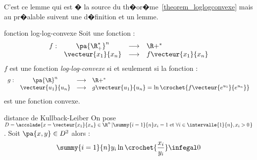 C'est ce lemme qui est � la source du th�or�me~\ref{theorem_loglogconvexe} mais au pr�alable suivent une d�finition et un lemme.








            \begin{xdefinition}{fonction log-log-convexe}
            \label{definition_log_log_convexe}
            Soit une fonction :
                    $$
                    \begin{array}{rccl}
                    f : & \pa{\R^*_+}^n &\longrightarrow& \R+^* \\
                    & \vecteur{x_1}{x_n} &\longrightarrow& f \vecteur{x_1}{x_n}
                    \end{array}
                    $$
            $f$ est une fonction \emph{log-log-convexe} si et seulement si la fonction :
                    $$
                    \begin{array}{rccl}
                    g : & \pa{\R}^n &\longrightarrow& \R+^* \\
                    & \vecteur{u_1}{u_n} &\longrightarrow& g\vecteur{u_1}{u_n} = \ln \crochet{ f \vecteur{e^{u_1}}{e^{u_n}}}
                    \end{array}
                    $$
            est une fonction convexe.
            \end{xdefinition}







            \begin{xlemma}{distance de Kullback-Leiber}
            \label{lemme_loglogconvexe}%
            On pose $D = \accolade{x=\vecteur{x_1}{x_n} \in \R^n \left| \summy{i=1}{n} x_i = 1 \text{ et } 
                            \forall i \in \intervalle{1}{n}, x_i > 0 \right.} $.\newline%
            Soit $\pa{x,y} \in D^2$ alors :
                    $$
                    \summy{i=1}{n} y_i \ln \crochet{\dfrac{x_i}{y_i}} \infegal 0
                    $$
            \end{xlemma}


